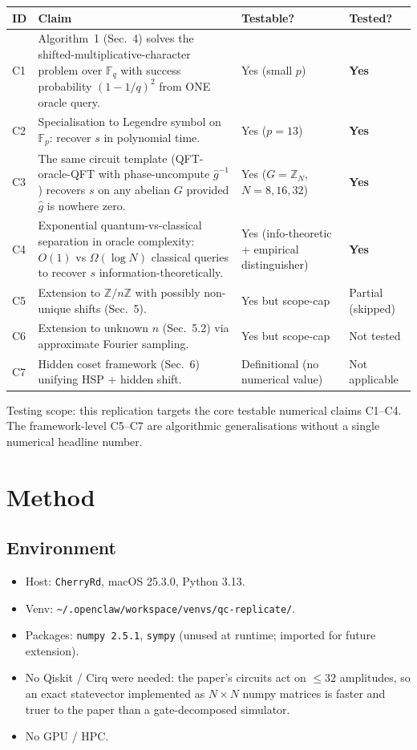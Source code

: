 \documentclass[11pt]{article}
\begin{document}
\begin{tabular}{lp{7.5cm}ll}
\toprule
ID  & Claim & Testable? & Tested? \\
\midrule
C1 & Algorithm~1 (Sec.~4) solves the shifted-multiplicative-character
     problem over $\mathbb{F}_q$ with success probability
     $(1-1/q)^2$ from ONE oracle query. & Yes (small $p$) & \textbf{Yes} \\
C2 & Specialisation to Legendre symbol on $\mathbb{F}_p$: recover $s$
     in polynomial time. & Yes ($p=13$) & \textbf{Yes} \\
C3 & The same circuit template (QFT-oracle-QFT with phase-uncompute
     $\hat g^{-1}$) recovers $s$ on any abelian $G$ provided $\hat g$
     is nowhere zero. & Yes ($G=\mathbb{Z}_N$, $N=8,16,32$) & \textbf{Yes} \\
C4 & Exponential quantum-vs-classical separation in oracle
     complexity: $O(1)$ vs $\Omega(\log N)$ classical queries to recover
     $s$ information-theoretically. & Yes (info-theoretic + empirical
     distinguisher) & \textbf{Yes} \\
C5 & Extension to $\mathbb{Z}/n\mathbb{Z}$ with possibly non-unique
     shifts (Sec.~5). & Yes but scope-cap & Partial (skipped) \\
C6 & Extension to unknown $n$ (Sec.~5.2) via approximate Fourier
     sampling. & Yes but scope-cap & Not tested \\
C7 & Hidden coset framework (Sec.~6) unifying HSP + hidden shift. &
     Definitional (no numerical value) & Not applicable \\
\bottomrule
\end{tabular}

Testing scope: this replication targets the core testable numerical
claims C1--C4.  The framework-level C5--C7 are algorithmic
generalisations without a single numerical headline number.

\section{Method}

\subsection{Environment}
\begin{itemize}
  \item Host: \texttt{CherryRd}, macOS 25.3.0, Python 3.13.
  \item Venv: \verb|~/.openclaw/workspace/venvs/qc-replicate/|.
  \item Packages: \texttt{numpy 2.5.1}, \texttt{sympy} (unused at
        runtime; imported for future extension).
  \item No Qiskit / Cirq were needed: the paper's circuits act on
        $\le 32$ amplitudes, so an exact statevector implemented as
        $N\times N$ numpy matrices is faster and truer to the paper
        than a gate-decomposed simulator.
  \item No GPU / HPC.
\end{itemize}
\end{document}
